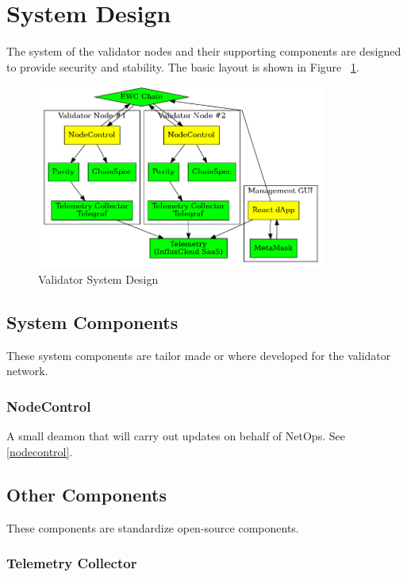 \section{System Design}

The system of the validator nodes and their supporting components are designed to provide security and stability. The basic layout is shown in Figure ~\ref{fig:sysdesign}.

\begin{figure}[ht]
	\centering
    \includegraphics[width=0.85\textwidth,keepaspectratio]{./images/sys-diagram.png}
	\caption{Validator System Design}
	\label{fig:sysdesign}
\end{figure}

\subsection{System Components}
\label{components}

These system components are tailor made or where developed for the validator network.

\subsubsection{NodeControl}

A small deamon that will carry out updates on behalf of NetOps. See \ref{nodecontrol}.

\subsection{Other Components}

These components are standardize open-source components.

\subsubsection{Telemetry Collector}

